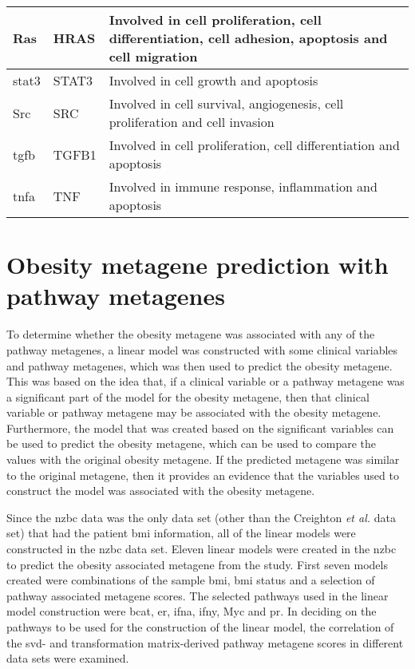 \begin{longtable}{llp{8cm}}
	\hline
	\rule{0pt}{2.25ex}Ras         & HRAS   & Involved in cell proliferation, cell differentiation, cell adhesion, apoptosis and cell migration\\
	\hline
	\rule{0pt}{2.25ex}\Gls{stat3} & STAT3  & Involved in cell growth and apoptosis\\
	\hline
	\rule{0pt}{2.25ex}Src         & SRC    & Involved in cell survival, angiogenesis, cell proliferation and cell invasion\\
	\hline
	\rule{0pt}{2.25ex}\Gls{tgfb}  & TGFB1  & Involved in cell proliferation, cell differentiation and apoptosis\\
	\hline
	\rule{0pt}{2.25ex}\Gls{tnfa}  & TNF    & Involved in immune response, inflammation and apoptosis\\
\end{longtable}

\section{Obesity metagene prediction with pathway metagenes}
\label{sec:obesity_metagene_prediction_with_pathway_metagenes}

To determine whether the obesity metagene was associated with any of the pathway metagenes, a linear model was constructed with some clinical variables and pathway metagenes, which was then used to predict the obesity metagene.
This was based on the idea that, if a clinical variable or a pathway metagene was a significant part of the model for the obesity metagene, then that clinical variable or pathway metagene may be associated with the obesity metagene.
Furthermore, the model that was created based on the significant variables can be used to predict the obesity metagene, which can be used to compare the values with the original obesity metagene.
If the predicted metagene was similar to the original metagene, then it provides an evidence that the variables used to construct the model was associated with the obesity metagene.

Since the \gls{nzbc} data was the only data set (other than the Creighton \textit{et al.} data set) that had the patient \gls{bmi} information, all of the linear models were constructed in the \gls{nzbc} data set.
Eleven linear models were created in the \gls{nzbc} to predict the obesity associated metagene from the \citet{Creighton2012} study.
First seven models created were combinations of the sample \gls{bmi}, \gls{bmi} status and a selection of pathway associated metagene scores.
The selected pathways used in the linear model construction were \gls{bcat}, \gls{er}, \gls{ifna}, \gls{ifny}, Myc and \gls{pr}.
In deciding on the pathways to be used for the construction of the linear model, the correlation of the \gls{svd}- and transformation matrix-derived pathway metagene scores in different data sets were examined.

